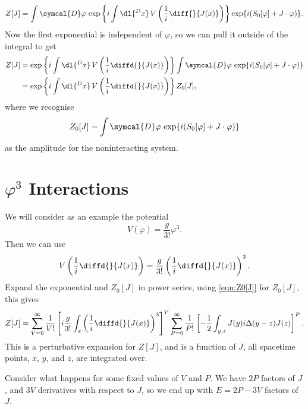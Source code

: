 \documentclass[fleqn]{NotesClass}
\newcommand{\DL}[1]{\symcal{D}#1}
\begin{document}
    \begin{equation}
        Z[J] = \int \DL{\varphi} \, \exp\left\{ i \int \dl{^Dx} \, V\left( \frac{1}{i} \diff{}{J(x)} \right) \right\} \exp\{i(S_0[\varphi] + J \cdot \varphi)\}.
    \end{equation}
    Now the first exponential is independent of \(\varphi\), so we can pull it outside of the integral to get
    \begin{align}
        Z[J] &= \exp\left\{ i \int \dl{^Dx} \, V\left( \frac{1}{i} \diffd{}{J(x)} \right) \right\} \int \DL{\varphi} \, \exp\{i(S_0[\varphi] + J \cdot \varphi)\}\\
        &= \exp\left\{ i \int \dl{^Dx} \, V\left( \frac{1}{i} \diffd{}{J(x)} \right) \right\} Z_0[J],
    \end{align}
    where we recognise
    \begin{equation}
        Z_0[J] = \int \DL{\varphi}\, \exp\{i(S_0[\varphi] + J \cdot \varphi)\}
    \end{equation}
    as the amplitude for the noninteracting system.
    
    \section{\texorpdfstring{\(\varphi^3\)}{Phi Cubed} Interactions}
    We will consider as an example the potential
    \begin{equation}
        V(\varphi) = \frac{g}{3!}\varphi^3.
    \end{equation}
    Then we can use
    \begin{equation}
        V\left( \frac{1}{i} \diffd{}{J(x)} \right) = \frac{g}{3!} \left( \frac{1}{i}\diffd{}{J(x)} \right)^3.
    \end{equation}
    Expand the exponential and \(Z_0[J]\) in power series, using \cref{eqn:Z0[J]} for \(Z_0[J]\), this gives
    \begin{equation}\label{eqn:Z[J] in phi cubed}
        Z[J] = \sum_{V = 0}^{\infty} \frac{1}{V!} \left[ i\frac{g}{3!} \int_x \left( \frac{1}{i} \diffd{}{J(x)} \right)^3 \right]^V \sum_{P = 0}^{\infty} \frac{1}{P!} \left[ -\frac{1}{2} \int_{y,z} J(y) i\Delta(y - z) J(z) \right]^P.
    \end{equation}
    This is a perturbative expansion for \(Z[J]\), and is a function of \(J\), all spacetime points, \(x\), \(y\), and \(z\), are integrated over.
    
    Consider what happens for some fixed values of \(V\) and \(P\).
    We have \(2P\) factors of \(J\), and \(3V\) derivatives with respect to \(J\), so we end up with \(E = 2P - 3V\) factors of \(J\).
    
\end{document}
